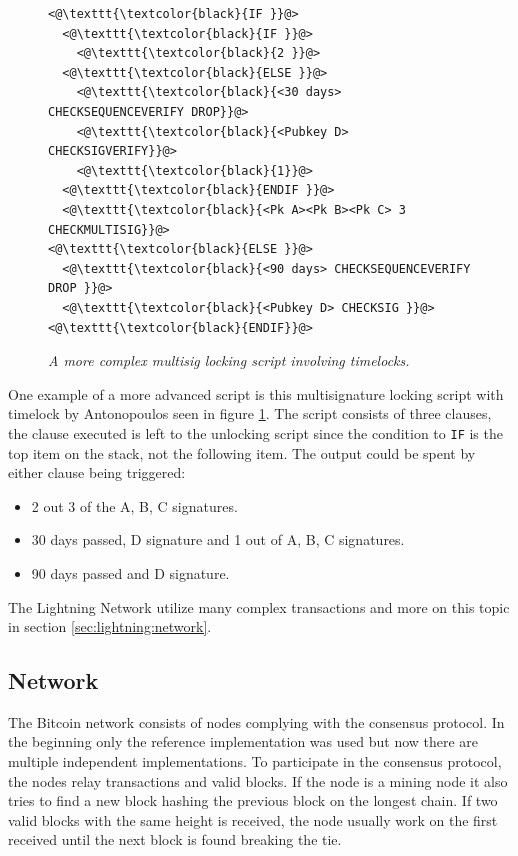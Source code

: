 \begin{figure}[hbt!]
	
	\begin{lstlisting}	
<@\texttt{\textcolor{black}{IF }}@>
  <@\texttt{\textcolor{black}{IF }}@>
    <@\texttt{\textcolor{black}{2 }}@>
  <@\texttt{\textcolor{black}{ELSE }}@>
    <@\texttt{\textcolor{black}{<30 days> CHECKSEQUENCEVERIFY DROP}}@>
    <@\texttt{\textcolor{black}{<Pubkey D> CHECKSIGVERIFY}}@>
    <@\texttt{\textcolor{black}{1}}@>
  <@\texttt{\textcolor{black}{ENDIF }}@>
  <@\texttt{\textcolor{black}{<Pk A><Pk B><Pk C> 3 CHECKMULTISIG}}@>
<@\texttt{\textcolor{black}{ELSE }}@>
  <@\texttt{\textcolor{black}{<90 days> CHECKSEQUENCEVERIFY DROP }}@>
  <@\texttt{\textcolor{black}{<Pubkey D> CHECKSIG }}@>
<@\texttt{\textcolor{black}{ENDIF}}@>

	\end{lstlisting}
	
	\caption{\textit{ A more complex multisig locking script involving timelocks.
	}}
	\label{fig:aantop:multi}
\end{figure}

One example of a more advanced script is this multisignature locking script with timelock by Antonopoulos seen in figure \ref{fig:aantop:multi}\cite{antonopoulos:bitcoin:scripting}. The script consists of three clauses, the clause executed is left to the unlocking script since the condition to \texttt{IF} is the top item on the stack, not the following item. The output could be spent by either clause being triggered:
\begin{itemize}
	\item 2 out 3 of the A, B, C signatures.
	\item 30 days passed, D signature and 1 out of A, B, C signatures.
	\item 90 days passed and D signature.
\end{itemize} 

The Lightning Network utilize many complex transactions and more on this topic in section \ref{sec:lightning:network}.

\subsection{Network}

The Bitcoin network consists of nodes complying with the consensus protocol. In the beginning only the reference implementation was used but now there are multiple independent implementations\cite{repository:bitcoin}\cite{repository:btcd}\cite{repository:neutrino}. To participate in the consensus protocol, the nodes relay transactions and valid blocks. If the node is a mining node it also tries to find a new block hashing the previous block on the longest chain. If two valid blocks with the same height is received, the node usually work on the first received until the next block is found breaking the tie. 



